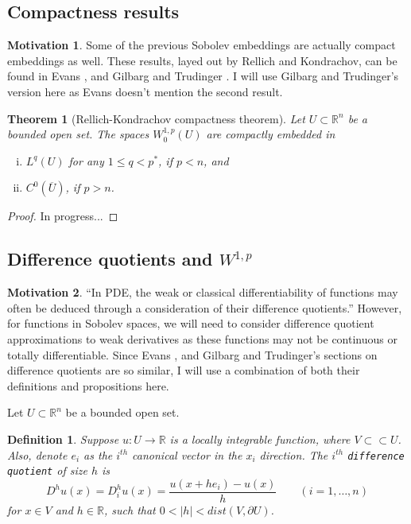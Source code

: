 \documentclass[11pt]{article}
\newtheorem{theorem}{Theorem}
\newtheorem{definition}{Definition}
\theoremstyle{definition}
\newtheorem*{motivation}{Motivation}
\begin{document}
\newpage

\subsection{Compactness results}
\begin{motivation}
	Some of the previous Sobolev embeddings are actually compact embeddings as well.
	These results, layed out by Rellich and Kondrachov, can be found in Evans \cite{evans1998partial}, and Gilbarg and Trudinger \cite{gilbarg2001elliptic}.
	I will use Gilbarg and Trudinger's version here as Evans doesn't mention the second result.
\end{motivation}

\begin{theorem}[Rellich-Kondrachov compactness theorem]
	Let $U \subset \mathbb{R}^n$ be a bounded open set. The spaces $W_0^{1,p}(U)$ are compactly embedded in
	\begin{enumerate}[(i)]
		\item $L^q(U)$ for any $1 \leq q < p^*$, if $p<n$, and
		\item $C^0(\overline{U})$, if $p>n$.
	\end{enumerate}
\end{theorem}
\begin{proof}
In progress...
\end{proof}

\newpage

\subsection{Difference quotients and $W^{1,p}$}
\begin{motivation}
	``In PDE, the weak or classical differentiability of functions may often be deduced through a consideration of their difference quotients.''
	\cite{gilbarg2001elliptic} However, for functions in Sobolev spaces, we will need to consider difference quotient approximations to
	weak derivatives as these functions may not be continuous or totally differentiable. Since Evans \cite{evans1998partial}, and
	Gilbarg and Trudinger's \cite{gilbarg2001elliptic} sections on difference quotients are so similar, I will use a combination of
	both their definitions and propositions here.
\end{motivation}
Let $U \subset \mathbb{R}^n$ be a bounded open set.
\begin{definition}
	Suppose $u : U \rightarrow \mathbb{R}$ is a locally integrable function, where $V \subset\subset U$.
	Also, denote $e_i$ as the $i^{th}$ canonical vector in the $x_i$ direction.
	The $i^{th}$ \texttt{difference quotient} of size $h$ is
	\begin{equation*}
		D^hu(x) = D_i^hu(x) = \frac{u(x + he_i) - u(x)}{h} \qquad (i = 1,\dots,n)
	\end{equation*}
	for $x \in V$ and $h \in \mathbb{R}$, such that $0 < |h| < dist(V,\partial U)$.
\end{definition}
\end{document}
